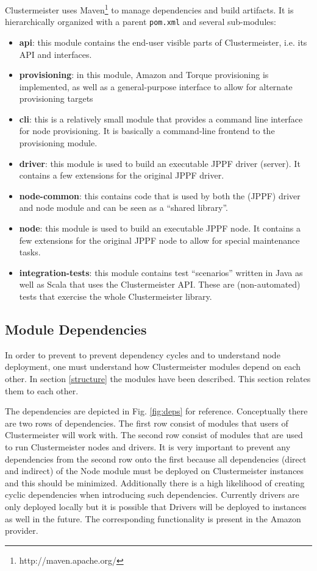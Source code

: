 \documentclass[12pt]{article}
\begin{document}
Clustermeister uses Maven\footnote{http://maven.apache.org/} to manage dependencies and build artifacts. It is hierarchically organized with a parent \texttt{pom.xml} and several sub-modules:

\begin{itemize}
 \item \textbf{api}: this module contains the end-user visible parts of Clustermeister, i.e. its API and interfaces.
 \item \textbf{provisioning}: in this module, Amazon and Torque provisioning is implemented, as well as a general-purpose interface to allow for alternate provisioning targets
 \item \textbf{cli}: this is a relatively small module that provides a command line interface for node provisioning. It is basically a command-line frontend to the provisioning module.
 \item \textbf{driver}: this module is used to build an executable JPPF driver (server). It contains a few extensions for the original JPPF driver.
 \item \textbf{node-common}: this contains code that is used by both the (JPPF) driver and node module and can be seen as a ``shared library''.
 \item \textbf{node}: this module is used to build an executable JPPF node. It contains a few extensions for the original JPPF node to allow for special maintenance tasks.
 \item \textbf{integration-tests}: this module contains test ``scenarios'' written in Java as well as Scala that uses the Clustermeister API. These are (non-automated) tests that exercise the whole Clustermeister library.
\end{itemize}

\subsection{Module Dependencies}
In order to prevent to prevent dependency cycles and to understand node deployment, one must understand how Clustermeister modules depend on each other. In section \ref{structure} the modules have been described. This section relates them to each other.

The dependencies are depicted in Fig. \ref{fig:deps} for reference. Conceptually there are two rows of dependencies. The first row consist of modules that users of Clustermeister will work with. The second row consist of modules that are used to run Clustermeister nodes and drivers. It is very important to prevent any dependencies from the second row onto the first because all dependencies (direct and indirect) of the Node module must be deployed on Clustermeister instances and this should be minimized. Additionally there is a high likelihood of creating cyclic dependencies when introducing such dependencies. Currently drivers are only deployed locally but it is possible that Drivers will be deployed to instances as well in the future. The corresponding functionality is present in the Amazon provider. 
\end{document}
